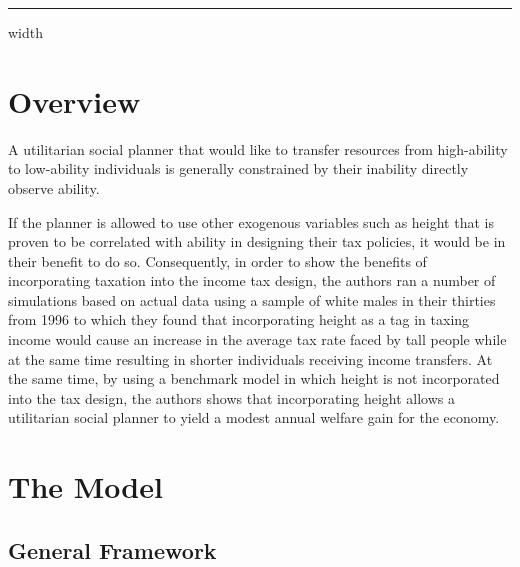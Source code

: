 \documentclass[titlepage]{\econtex}
\begin{document}

\titlepagefinish



\hrule height 0.4pt depth 0.0pt width \textwidth \relax

\medskip \medskip

\hypertarget{Overview}{}
\section{Overview}

A utilitarian social planner that would like to transfer resources from high-ability to low-ability individuals is generally constrained by their inability directly observe ability.

If the planner is allowed to use other exogenous variables such as  height that is proven to be correlated with ability in designing their tax policies, it would be in their benefit to do so.
Consequently, in order to show the benefits of incorporating taxation into the income tax design, the authors ran a number of simulations based on actual data using a sample of white males in their thirties from 1996 to which they found that incorporating  height as a tag in taxing income would cause an increase in the average tax rate faced by tall people while at the same time resulting in shorter individuals receiving income transfers. At the same time, by using a benchmark model in which height is not incorporated into the tax design, the authors shows that incorporating height allows a  utilitarian social planner to  yield a modest annual welfare gain for the economy.

\hypertarget{The Model}{}
\section{The Model}

\hypertarget{General Framework}{}
\subsection{General Framework}
\end{document}
